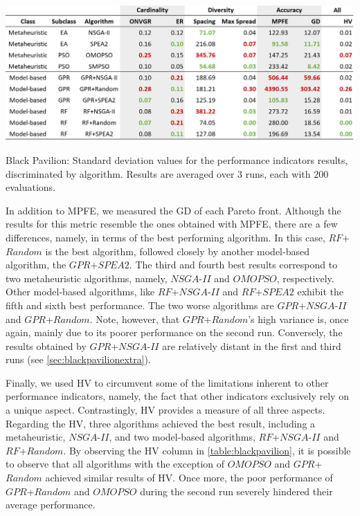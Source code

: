 \begin{table}[htbp]
	\centering
	\includegraphics[width=\textwidth]{Images/Evaluation/BlackPavilion/Results_Std_20190428.PNG}
	\caption[Black Pavilion: Standard deviation values for the performance indicators results, discriminated by algorithm]{Black Pavilion: Standard deviation values for the performance indicators results, discriminated by algorithm. Results are averaged over $3$ runs, each with $200$ evaluations.}
	\label{table:blackpavilionstd}
\end{table}

In addition to \ac{MPFE}, we measured the \ac{GD} of each Pareto front. Although the results for this metric resemble the ones obtained with \ac{MPFE}, there are a few differences, namely, in terms of the best performing algorithm. In this case, $RF$+$Random$ is the best algorithm, followed closely by another model-based algorithm, the $GPR$+$SPEA2$. The third and fourth best results correspond to two metaheuristic algorithms, namely, $NSGA$-$II$ and $OMOPSO$, respectively. Other model-based algorithms, like $RF$+$NSGA$-$II$ and $RF$+$SPEA2$ exhibit the fifth and sixth best performance. The two worse algorithms are $GPR$+$NSGA$-$II$ and $GPR$+$Random$. Note, however, that $GPR$+$Random$'s high variance is, once again, mainly due to its poorer performance on the second run. Conversely, the results obtained by $GPR$+$NSGA$-$II$ are relatively distant in the first and third runs (see \cref{sec:blackpavilionextra}).

Finally, we used \ac{HV} to circumvent some of the limitations inherent to other performance indicators, namely, the fact that other indicators exclusively rely on a unique aspect. Contrastingly, \ac{HV} provides a measure of all three aspects. Regarding the \ac{HV}, three algorithms achieved the best result, including a metaheuristic, $NSGA$-$II$, and two model-based algorithms, $RF$+$NSGA$-$II$ and $RF$+$Random$. By observing the \ac{HV} column in \cref{table:blackpavilion}, it is possible to observe that all algorithms with the exception of $OMOPSO$ and $GPR$+$Random$ achieved similar results of \ac{HV}. Once more, the poor performance of $GPR$+$Random$ and $OMOPSO$ during the second run severely hindered their average performance.

